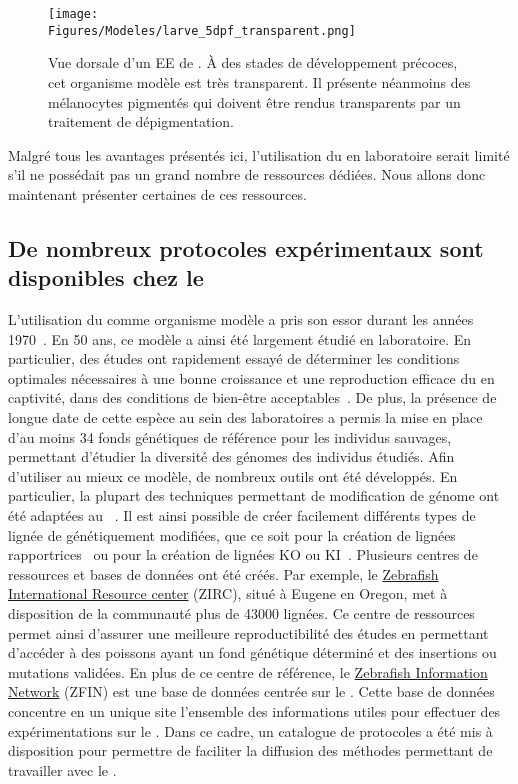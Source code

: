 \documentclass[\main/main.tex]{subfiles}
\begin{document}
\begin{figure}[h!]
    \centering
    \texttt{[image: \\Figures/Modeles/larve\_5dpf\_transparent.png]}
    \caption{Vue dorsale d'un EE de \pz{}.\newline
    À des stades de développement précoces, cet organisme modèle est très transparent.
    Il présente néanmoins des mélanocytes pigmentés qui doivent être rendus transparents par un traitement de dépigmentation.
    }
    \label{fig:zebra:transparent}
\end{figure}


%
Malgré tous les avantages présentés ici, l'utilisation du \pz{} en laboratoire serait limité s'il ne possédait pas un grand nombre de ressources dédiées.
%
Nous allons donc maintenant présenter certaines de ces ressources.

    \subsection{De nombreux protocoles expérimentaux sont disponibles chez le \pz{}}
    
%
L'utilisation du \pz{} comme organisme modèle a pris son essor durant les années 1970~\cite{laale_1977}.
%
En 50 ans, ce modèle a ainsi été largement étudié en laboratoire.
%
En particulier, des études ont rapidement essayé de déterminer les conditions optimales nécessaires à une bonne croissance et une reproduction efficace du \pz{} en captivité, dans des conditions de bien-être acceptables~\cite{eaton_1974,eaton_1974a}.
%
De plus, la présence de longue date de cette espèce au sein des laboratoires a permis la mise en place d'au moins 34 fonds génétiques de référence pour les individus sauvages,
permettant d'étudier la diversité des génomes des individus étudiés.
%
Afin d'utiliser au mieux ce modèle, de nombreux outils ont été développés.
%
En particulier, la plupart des techniques permettant de modification de génome ont été adaptées au \pz{}~\cite{auer_2014,irion_2014,foley_2009,bill_2009}.
%
Il est ainsi possible de créer facilement différents types de lignée de \pz{} génétiquement modifiées, que ce soit pour la création de lignées rapportrices~\cite{brion_2012,goldman_2001} ou pour la création de lignées KO ou KI~\cite{liu_2019}.
%
Plusieurs centres de ressources et bases de données ont été créés.
%
Par exemple, le \href{https://zebrafish.org/home/guide.php}{Zebrafish International Resource center} (ZIRC), situé à Eugene en Oregon, met à disposition de la communauté plus de 43000 lignées.
%
Ce centre de ressources permet ainsi d'assurer une meilleure reproductibilité des études
en permettant d'accéder à des poissons ayant un fond génétique déterminé et des insertions ou mutations validées.
%
En plus de ce centre de référence, le \href{https://zfin.org/}{Zebrafish Information Network} (ZFIN) est une base de données centrée sur le \pz{}.
%
Cette base de données concentre en un unique site l'ensemble des informations utiles pour effectuer des expérimentations sur le \pz{}.
%
Dans ce cadre, un catalogue de protocoles a été mis à disposition pour permettre de faciliter la diffusion des méthodes permettant de travailler avec le \pz{}.
\end{document}
